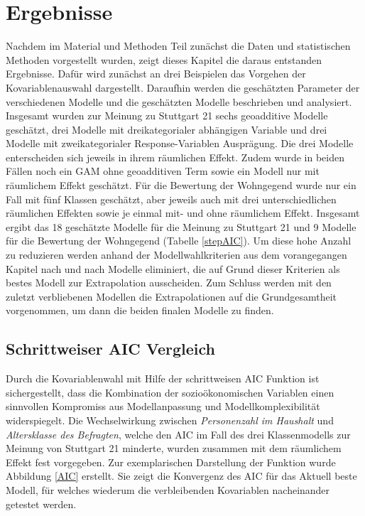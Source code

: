 \documentclass{Vorlage}
\begin{document}
\section{Ergebnisse}
Nachdem im Material und Methoden Teil zunächst die Daten und statistischen Methoden vorgestellt wurden, zeigt dieses Kapitel die daraus entstanden Ergebnisse. Dafür wird zunächst an drei Beispielen das Vorgehen der Kovariablenauswahl dargestellt. Daraufhin werden die geschätzten Parameter der verschiedenen Modelle und die geschätzten Modelle beschrieben und analysiert. Insgesamt wurden zur Meinung zu Stuttgart 21 sechs geoadditive Modelle geschätzt, drei Modelle mit dreikategorialer abhängigen Variable und drei Modelle mit zweikategorialer Response-Variablen Ausprägung. Die drei Modelle enterscheiden sich jeweils in ihrem räumlichen Effekt. Zudem wurde in beiden Fällen noch ein GAM ohne geoadditiven Term sowie ein Modell nur mit räumlichem Effekt geschätzt. Für die Bewertung der Wohngegend wurde nur ein Fall mit fünf Klassen geschätzt, aber jeweils auch mit drei unterschiedlichen räumlichen Effekten sowie je einmal mit- und ohne räumlichem Effekt. Insgesamt ergibt das 18 geschätzte Modelle für die Meinung zu Stuttgart 21 und 9 Modelle für die Bewertung der Wohngegend (Tabelle \ref{stepAIC}). Um diese hohe Anzahl zu reduzieren werden anhand der Modellwahlkriterien aus dem vorangegangen Kapitel nach und nach Modelle eliminiert, die auf Grund dieser Kriterien als bestes Modell zur Extrapolation ausscheiden. Zum Schluss werden mit den zuletzt verbliebenen Modellen die Extrapolationen auf die Grundgesamtheit vorgenommen, um dann die beiden finalen Modelle zu finden. 

\subsection{Schrittweiser AIC Vergleich}
Durch die Kovariablenwahl mit Hilfe der schrittweisen AIC Funktion ist sichergestellt, dass die Kombination der sozioökonomischen Variablen einen sinnvollen Kompromiss aus Modellanpassung und Modellkomplexibilität widerspiegelt. Die Wechselwirkung zwischen \textit{Personenzahl im Haushalt} und \textit{Altersklasse des Befragten}, welche den AIC im Fall des drei Klassenmodells zur Meinung von Stuttgart 21 minderte, wurden zusammen mit dem räumlichem Effekt fest vorgegeben. Zur exemplarischen Darstellung der Funktion wurde Abbildung \ref{AIC} erstellt. Sie zeigt die Konvergenz des AIC für das Aktuell beste Modell, für welches wiederum die verbleibenden Kovariablen nacheinander getestet werden. 
\end{document}
